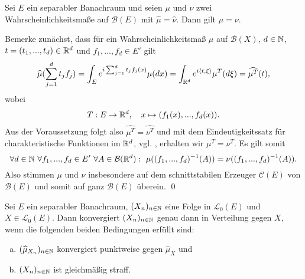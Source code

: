 \begin{theorem}[Eindeutigkeitssatz]
    Sei $E$ ein separabler Banachraum und seien $\mu$ und $\nu$ zwei Wahrscheinlichkeitsmaße auf $\mathcal{B}(E)$ mit $\widehat{\mu} = \widehat{\nu}$. Dann gilt $\mu = \nu$.
\end{theorem}

\begin{proof*}
    Bemerke zunächst, dass für ein Wahrscheinlichkeitsmaß $\mu$ auf $\mathcal{B}(X)$, $d \in  \mathbb{N}$, $t=(t_1,...,t_d) \in \mathbb{R}^d$ und $f_1,..., f_d \in E'$ gilt
    $$
        \widehat{\mu}(\sum_{j=1}^d t_j f_j) = \int_E e^{i\sum_{j=1}^dt_jf_j(x)}\mu(dx) = \int_{\mathbb{R}^d} e^{i\langle t, \xi \rangle}\mu^T(d\xi) = \widehat{\mu^T}(t),
    $$
    wobei 
    $$
        T: E \to \mathbb{R}^d, \quad x \mapsto (f_1(x),...,f_d(x)). 
    $$
    Aus der Voraussetzung folgt also $\widehat{\mu^T} = \widehat{\nu^T}$ und mit dem Eindeutigkeitssatz für charakteristische Funktionen im $\mathbb{R}^d$, vgl. \cite[Satz 8.7.1]{gs}, erhalten wir $\mu^T = \nu^T$. 
    Es gilt somit
    $$
        \forall d\in \N \ \forall f_1,...,f_d \in E' \ \forall A \in \mathcal{B}(\R^d): \ \mu((f_1,...,f_d)^{-1}(A)) =  \nu((f_1,...,f_d)^{-1}(A)). 
    $$
    Also stimmen $\mu$ und $\nu$ insbesondere auf dem schnittstabilen Erzeuger $\mathcal{C}(E)$ von $\mathcal{B}(E)$ und somit auf ganz $\mathcal{B}(E)$ überein. \qed
\end{proof*}

\begin{theorem}
    Sei  $E$ ein separabler Banachraum, $(X_n)_{n \in \mathbb{N}}$ eine Folge in $\mathcal{L}_0(E)$ und $X \in \mathcal{L}_0(E)$. 
    Dann konvergiert $(X_n)_{n \in \mathbb{N}}$ genau dann in Verteilung gegen $X$, wenn die folgenden beiden Bedingungen erfüllt sind:
    \begin{enumerate}[(a)]
        \item $(\widehat{\mu}_{X_n})_{n \in \mathbb{N}}$ konvergiert punktweise gegen $\widehat{\mu}_X$ und
        \item $(X_n)_{n \in \mathbb{N}}$ ist gleichmäßig straff. 
    \end{enumerate}
\end{theorem}

